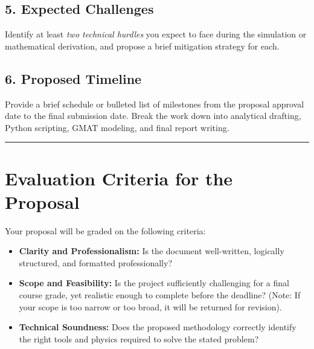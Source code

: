 \documentclass[11pt, letterpaper]{article}
\begin{document}
\subsection*{5. Expected Challenges}
Identify at least \textit{two technical hurdles} you expect to face during the simulation or mathematical derivation, and propose a brief mitigation strategy for each.

\subsection*{6. Proposed Timeline}
Provide a brief schedule or bulleted list of milestones from the proposal approval date to the final submission date. Break the work down into analytical drafting, Python scripting, GMAT modeling, and final report writing.

\vspace{0.5cm}
\hrule
\vspace{0.5cm}

\section*{Evaluation Criteria for the Proposal}
Your proposal will be graded on the following criteria:
\begin{itemize}
    \item \textbf{Clarity and Professionalism:} Is the document well-written, logically structured, and formatted professionally?
    \item \textbf{Scope and Feasibility:} Is the project sufficiently challenging for a final course grade, yet realistic enough to complete before the deadline? (Note: If your scope is too narrow or too broad, it will be returned for revision).
    \item \textbf{Technical Soundness:} Does the proposed methodology correctly identify the right tools and physics required to solve the stated problem?
\end{itemize}
\end{document}
